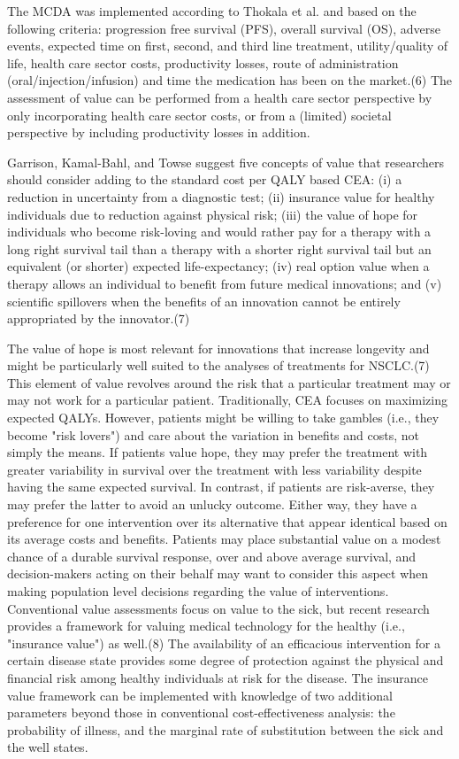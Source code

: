 \documentclass[11pt,final,fleqn]{article}\usepackage[]{graphicx}\usepackage[]{color}
\theoremstyle{plain}
\begin{document}
{The MCDA was implemented according to Thokala et al. and based on the following criteria: progression free survival (PFS), overall survival (OS), adverse events, expected time on first, second, and third line treatment, utility/quality of life, health care sector costs, productivity losses, route of administration (oral/injection/infusion) and time the medication has been on the market.(6) The assessment of value can be performed from a health care sector perspective by only incorporating health care sector costs, or from a (limited) societal perspective by including productivity losses in addition.

Garrison, Kamal-Bahl, and Towse suggest five concepts of value that researchers should consider adding to the standard cost per QALY based CEA: (i) a reduction in uncertainty from a diagnostic test; (ii) insurance value for healthy individuals due to reduction against physical risk; (iii) the value of hope for individuals who become risk-loving and would rather pay for a therapy with a long right survival tail than a therapy with a shorter right survival tail but an equivalent (or shorter) expected life-expectancy; (iv) real option value when a therapy allows an individual to benefit from future medical innovations; and (v) scientific spillovers when the benefits of an innovation cannot be entirely appropriated by the innovator.(7)

The value of hope is most relevant for innovations that increase longevity and might be particularly well suited to the analyses of treatments for NSCLC.(7) This element of value revolves around the risk that a particular treatment may or may not work for a particular patient. Traditionally, CEA focuses on maximizing expected QALYs. However, patients might be willing to take gambles (i.e., they become "risk lovers") and care about the variation in benefits and costs, not simply the means. If patients value hope, they may prefer the treatment with greater variability in survival over the treatment with less variability despite having the same expected survival. In contrast, if patients are risk-averse, they may prefer the latter to avoid an unlucky outcome. Either way, they have a preference for one intervention over its alternative that appear identical based on its average costs and benefits. Patients may place substantial value on a modest chance of a durable survival response, over and above average survival, and decision-makers acting on their behalf may want to consider this aspect when making population level decisions regarding the value of interventions. 
Conventional value assessments focus on value to the sick, but recent research provides a framework for valuing medical technology for the healthy (i.e., "insurance value") as well.(8) The availability of an efficacious intervention for a certain disease state provides some degree of protection against the physical and financial risk among healthy individuals at risk for the disease. The insurance value framework can be implemented with knowledge of two additional parameters beyond those in conventional cost-effectiveness analysis: the probability of illness, and the marginal rate of substitution between the sick and the well states. 

}
\end{document}

